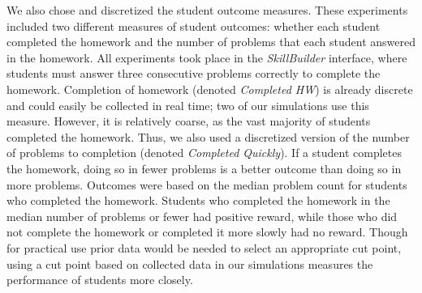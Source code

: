 We also chose and discretized the student outcome measures. These experiments included two different measures of student outcomes: whether each student completed the homework and the number of problems that each student answered in the homework. 
All experiments took place in the \textit{SkillBuilder} interface, where students must answer three consecutive problems correctly to complete the homework. 
Completion of homework (denoted \textit{Completed HW}) is already discrete and could easily be collected in real time; two of our simulations use this measure. 
However, it is relatively coarse, as the vast majority of students completed the homework.
Thus, we also used a discretized version of the number of problems to completion (denoted \textit{Completed Quickly}). If a student completes the homework, doing so in fewer problems is a better outcome than doing so in more problems. Outcomes were based on the median problem count for students who completed the homework. Students who completed the homework in the median number of problems or fewer had positive reward, while those who did not complete the homework or completed it more slowly had no reward.
Though for practical use prior data would be needed to select an appropriate cut point, using a cut point based on collected data in our simulations measures the performance of students more closely.




